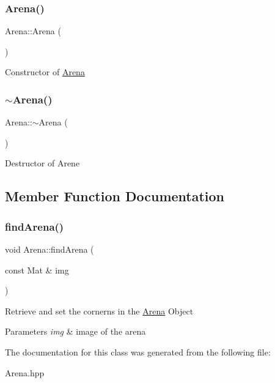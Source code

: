 \subsubsection{\texorpdfstring{Arena()}{Arena()}}
{\footnotesize\ttfamily Arena\+::\+Arena (\begin{DoxyParamCaption}{ }\end{DoxyParamCaption})}

Constructor of \mbox{\hyperlink{class_arena}{Arena}} \mbox{\label{class_arena_ae21b399e9e3f6b8ac4ecc44d7d1667fc}} 
\subsubsection{\texorpdfstring{$\sim$\+Arena()}{~Arena()}}
{\footnotesize\ttfamily Arena\+::$\sim$\+Arena (\begin{DoxyParamCaption}{ }\end{DoxyParamCaption})}

Destructor of Arene 

\subsection{Member Function Documentation}
\mbox{\label{class_arena_aa37acdf43108ab0da04b77bbf79c2f7d}} 
\subsubsection{\texorpdfstring{find\+Arena()}{findArena()}}
{\footnotesize\ttfamily void Arena\+::find\+Arena (\begin{DoxyParamCaption}\item[{const Mat \&}]{img }\end{DoxyParamCaption})}

Retrieve and set the cornerns in the \mbox{\hyperlink{class_arena}{Arena}} Object 
\begin{DoxyParams}{Parameters}
{\em img} & image of the arena \\
\hline
\end{DoxyParams}


The documentation for this class was generated from the following file\+:\begin{DoxyCompactItemize}
\item 
Arena.\+hpp\end{DoxyCompactItemize}
